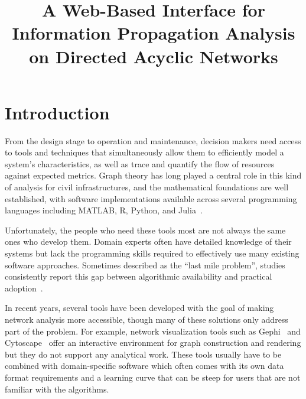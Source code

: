 \documentclass[conference]{IEEEtran}
\begin{document}
\title{A Web-Based Interface for Information Propagation Analysis on Directed Acyclic Networks}

\author{
}

\maketitle

\begin{abstract}
\end{abstract}

\section{Introduction}
From the design stage to operation and maintenance, decision makers need access to tools and techniques that simultaneously allow them to efficiently model a system's characteristics, as well as trace and quantify the flow of resources against expected metrics. Graph theory has long played a central role in this kind of analysis for civil infrastructures, and the mathematical foundations are well established, with software implementations available across several programming languages including MATLAB, R, Python, and Julia~\cite{pearl1988probabilistic, koller2009probabilistic, ferson2015}.



Unfortunately, the people who need these tools most are not always the same ones who develop them. Domain experts often have detailed knowledge of their systems but lack the programming skills required to effectively use many existing software approaches. Sometimes described as the ``last mile problem'', studies consistently report this gap between algorithmic availability and practical adoption~\cite{hannay2009scientists, prabhu2011survey}.



In recent years, several tools have been developed with the goal of making network analysis more accessible, though many of these solutions only address part of the problem. For example, network visualization tools such as Gephi~\cite{bastian2009gephi} and Cytoscape~\cite{shannon2003cytoscape} offer an interactive environment for graph construction and rendering but they do not support any analytical work. These tools usually have to be combined with domain-specific software which often comes with its own data format requirements and a learning curve that can be steep for users that are not familiar with the algorithms. 
\end{document}

